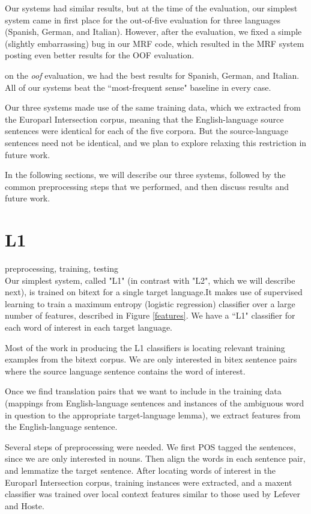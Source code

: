 \documentclass[11pt,letterpaper]{article}
\begin{document}
Our systems had similar results, but at the time of the evaluation, our simplest system came in first place for the out-of-five evaluation for three languages (Spanish, German, and Italian).
However, after the evaluation, we fixed a simple (slightly embarrassing) bug in our MRF code, which resulted in the MRF system posting even better results for the OOF evaluation.

on the \emph{oof} evaluation, we had the best results for Spanish, German, and Italian.
All of our systems beat the ``most-frequent sense" baseline in every case.


Our three systems made use of the same training data, which we extracted from
the Europarl Intersection corpus, meaning that the English-language source
sentences were identical for each of the five corpora. But the source-language
sentences need not be identical, and we plan to explore relaxing this
restriction in future work.

In the following sections, we will describe our three systems, followed by the
common preprocessing steps that we performed, and then discuss results and
future work.

\section{L1}
preprocessing, training, testing\\

Our simplest system, called "L1" (in contrast with "L2", which we will describe
next), is trained on bitext for a single target language.It makes use of
supervised learning to train a maximum entropy (logistic regression) classifier
over a large number of features, described in Figure \ref{features}. 
We have a ``L1" classifier for each word of interest in each target language.

Most of the work in producing the L1 classifiers is locating relevant training
examples from the bitext corpus. We are only interested in bitex sentence pairs
where the source language sentence contains the word of interest.

Once we find translation pairs that we want to include in the training data
(mappings from English-language sentences and instances of the ambiguous word
in question to the appropriate target-language lemma), we extract features from
the English-language sentence. 

Several steps of preprocessing were needed. We first POS tagged the sentences, since we are only interested in nouns.
Then align the words in each sentence pair, and lemmatize the target sentence.
After locating words of interest in the
Europarl Intersection corpus, training instances were extracted, and a maxent
classifier was trained over local context features similar to those used by Lefever and
Hoste.
\end{document}
